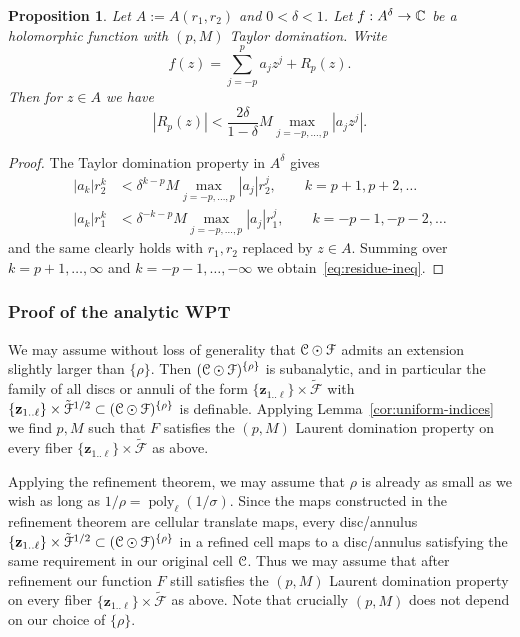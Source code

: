 \documentclass[reqno]{amsart}
\newtheorem{Prop}[Cor]{Proposition}{\bfseries}{\itshape}
\renewcommand\~[1]{\widetilde{#1}}
\def\poly{\operatorname{poly}} \def\J{\operatorname{J}}
\def\cF{{\mathcal F}} \def\cL{{\mathcal L}} \def\cR{{\mathcal R}}
\def\vz{{\mathbf z}}
\def\he#1{{\{#1\}}}
\def\hrho{{\he\rho}}
\begin{document}
\begin{Prop}\label{prop:residue-domination}
  Let $A:=A(r_1,r_2)$ and $0<\delta<1$. Let $f:A^\delta\to{\mathbb C}$ be a
  holomorphic function with $(p,M)$ Taylor domination. Write
  \begin{equation}
    f(z)=\sum_{j=-p}^p a_j z^j + R_p(z).
  \end{equation}
  Then for $z\in A$ we have
  \begin{equation}\label{eq:residue-ineq}
    |R_p(z)| < \frac{2\delta}{1-\delta} M \max_{j=-p,\ldots,p} |a_j z^j|.
  \end{equation}
\end{Prop}
\begin{proof}
  The Taylor domination property in $A^\delta$ gives
  \begin{equation}
    \begin{aligned}
      |a_k| r_2^k &< \delta^{k-p} M \max_{j=-p,\ldots,p} |a_j| r_2^j , \qquad
      k=p+1,p+2,\ldots \\
      |a_k| r_1^k  &< \delta^{-k-p} M \max_{j=-p,\ldots,p} |a_j| r_1^j, \qquad
      k=-p-1,-p-2,\ldots
    \end{aligned}  
  \end{equation}
  and the same clearly holds with $r_1,r_2$ replaced by $z\in A$.
  Summing over $k=p+1,\ldots,\infty$ and $k=-p-1,\ldots,-\infty$ we
  obtain~\eqref{eq:residue-ineq}.
\end{proof}

\subsubsection{Proof of the analytic WPT}

We may assume without loss of generality that $\cC\odot\cF$ admits an
extension slightly larger than $\hrho$. Then $(\cC\odot\cF)^\hrho$ is
subanalytic, and in particular the family of all discs or annuli of
the form $\{\vz_{1..\ell}\}\times\tilde\cF$ with
$\{\vz_{1..\ell}\}\times\tilde\cF^{1/2}\subset(\cC\odot\cF)^\hrho$ is
definable. Applying Lemma~\ref{cor:uniform-indices} we find $p,M$
such that $F$ satisfies the $(p,M)$ Laurent domination property on
every fiber $\{\vz_{1..\ell}\}\times\tilde\cF$ as above.

Applying the refinement theorem, we may assume that $\rho$ is already
as small as we wish as long as $1/\rho=\poly_\ell(1/\sigma)$. Since
the maps constructed in the refinement theorem are cellular translate
maps, every disc/annulus
$\{\vz_{1..\ell}\}\times\tilde\cF^{1/2}\subset(\cC\odot\cF)^\hrho$ in
a refined cell maps to a disc/annulus satisfying the same requirement
in our original cell ${\mathcal C}$. Thus we may assume that after refinement
our function $F$ still satisfies the $(p,M)$ Laurent domination
property on every fiber $\{\vz_{1..\ell}\}\times\tilde\cF$ as
above. Note that crucially $(p,M)$ does not depend on our choice of $\hrho$.
\end{document}
